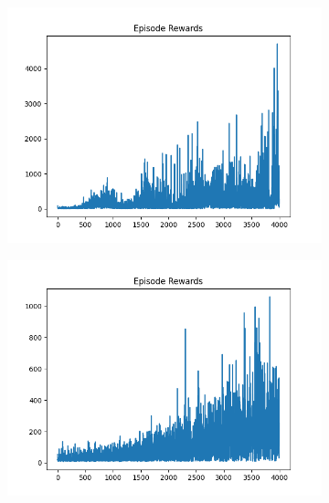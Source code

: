 \begin{figure}[H]
\begin{subfigure}{.47\linewidth}
        \includegraphics[width=\textwidth]{pole/2024-06-14_11-09-14_dqn_cartpole_episode_rewards.png}
    \end{subfigure}
    \begin{subfigure}{.47\linewidth}
        \centering
        \includegraphics[width=\textwidth]{pole/2024-06-14_09-34-50_dqn_cartpole_episode_rewards.png}
    \end{subfigure}
\end{figure}
